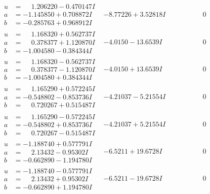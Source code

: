 \documentclass[1p]{elsarticle_modified}
\theoremstyle{definition}
\begin{document}
$$\begin{array}{c|c|c}
\begin{aligned}
u &= \phantom{-}1.206220 - 0.470147 I \\
a &= -1.145850 + 0.708872 I \\
b &= -0.285763 + 0.968912 I\end{aligned}
 & -8.77226 + 3.52818 I & \phantom{-0.000000 } 0 \\ \hline\begin{aligned}
u &= \phantom{-}1.168320 + 0.562737 I \\
a &= \phantom{-}0.378377 + 1.120870 I \\
b &= -1.004580 - 0.384344 I\end{aligned}
 & -4.0150 - 13.6539 I & \phantom{-0.000000 } 0 \\ \hline\begin{aligned}
u &= \phantom{-}1.168320 - 0.562737 I \\
a &= \phantom{-}0.378377 - 1.120870 I \\
b &= -1.004580 + 0.384344 I\end{aligned}
 & -4.0150 + 13.6539 I & \phantom{-0.000000 } 0 \\ \hline\begin{aligned}
u &= \phantom{-}1.165290 + 0.572245 I \\
a &= -0.548802 - 0.853736 I \\
b &= \phantom{-}0.720267 + 0.515487 I\end{aligned}
 & -4.21037 - 5.21554 I & \phantom{-0.000000 } 0 \\ \hline\begin{aligned}
u &= \phantom{-}1.165290 - 0.572245 I \\
a &= -0.548802 + 0.853736 I \\
b &= \phantom{-}0.720267 - 0.515487 I\end{aligned}
 & -4.21037 + 5.21554 I & \phantom{-0.000000 } 0 \\ \hline\begin{aligned}
u &= -1.188740 + 0.577791 I \\
a &= \phantom{-}2.13432 - 0.95302 I \\
b &= -0.662890 - 1.194780 I\end{aligned}
 & -6.5211 + 19.6728 I & \phantom{-0.000000 } 0 \\ \hline\begin{aligned}
u &= -1.188740 - 0.577791 I \\
a &= \phantom{-}2.13432 + 0.95302 I \\
b &= -0.662890 + 1.194780 I\end{aligned}
 & -6.5211 - 19.6728 I & \phantom{-0.000000 } 0\\

\end{array}$$
\end{document}
